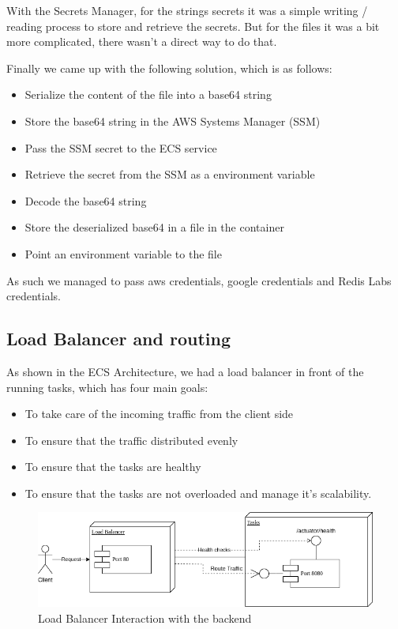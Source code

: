 With the Secrets Manager, for the strings secrets it was a simple writing / reading process
to store and retrieve the secrets. But for the files it was a bit more complicated, there
wasn't a direct way to do that.

Finally we came up with the following solution, which is as follows:

\begin{itemize}
    \item Serialize the content of the file into a base64 string
    \item Store the base64 string in the AWS Systems Manager (SSM)
    \item Pass the SSM secret to the ECS service
    \item Retrieve the secret from the SSM as a environment variable
    \item Decode the base64 string
    \item Store the deserialized base64 in a file in the container
    \item Point an environment variable to the file
\end{itemize}

As such we managed to pass aws credentials, google credentials and Redis Labs credentials.

\subsection {Load Balancer and routing}

As shown in the ECS Architecture, we had a load balancer in front of the running tasks, which has four main goals:

\begin{itemize}
    \item To take care of the incoming traffic from the client side
    \item To ensure that the traffic distributed evenly
    \item To ensure that the tasks are healthy
    \item To ensure that the tasks are not overloaded and manage it's scalability.
\end{itemize}

\begin{figure}[!htbp]
    \centering
    \includegraphics[width=\textwidth]{images/loadBalancer.png}
    \caption{\footnotesize{Load Balancer Interaction with the backend}}
    \label{fig:loadbalancer}
\end{figure}

